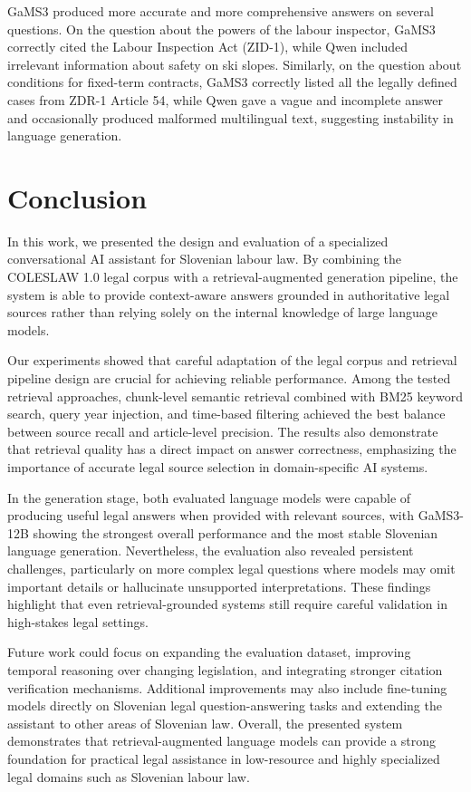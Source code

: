 \documentclass[fleqn,moreauthors,10pt]{ds_report}
\begin{document}
GaMS3 produced more accurate and more comprehensive answers on several questions. On the question about the powers of the labour inspector, GaMS3 correctly cited the Labour Inspection Act (ZID-1), while Qwen included irrelevant information about safety on ski slopes. Similarly, on the question about conditions for fixed-term contracts, GaMS3 correctly listed all the legally defined cases from ZDR-1 Article 54, while Qwen gave a vague and incomplete answer and occasionally produced malformed multilingual text, suggesting instability in language generation.


\section*{Conclusion}
In this work, we presented the design and evaluation of a specialized conversational AI assistant for Slovenian labour law. By combining the COLESLAW 1.0 legal corpus with a retrieval-augmented generation pipeline, the system is able to provide context-aware answers grounded in authoritative legal sources rather than relying solely on the internal knowledge of large language models.

Our experiments showed that careful adaptation of the legal corpus and retrieval pipeline design are crucial for achieving reliable performance. Among the tested retrieval approaches, chunk-level semantic retrieval combined with BM25 keyword search, query year injection, and time-based filtering achieved the best balance between source recall and article-level precision. The results also demonstrate that retrieval quality has a direct impact on answer correctness, emphasizing the importance of accurate legal source selection in domain-specific AI systems.

In the generation stage, both evaluated language models were capable of producing useful legal answers when provided with relevant sources, with GaMS3-12B showing the strongest overall performance and the most stable Slovenian language generation. Nevertheless, the evaluation also revealed persistent challenges, particularly on more complex legal questions where models may omit important details or hallucinate unsupported interpretations. These findings highlight that even retrieval-grounded systems still require careful validation in high-stakes legal settings.

Future work could focus on expanding the evaluation dataset, improving temporal reasoning over changing legislation, and integrating stronger citation verification mechanisms. Additional improvements may also include fine-tuning models directly on Slovenian legal question-answering tasks and extending the assistant to other areas of Slovenian law. Overall, the presented system demonstrates that retrieval-augmented language models can provide a strong foundation for practical legal assistance in low-resource and highly specialized legal domains such as Slovenian labour law.
\end{document}
